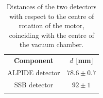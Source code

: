 \documentclass[../../main/main.tex]{subfiles}
\begin{document}
\begin{table}[!h]
    \centering
    \begin{tabular}{cc}
        \toprule
        \textbf{Component}  &   \textbf{\boldmath\( d \) [mm]}   \\
        \colrule
        ALPIDE detector & \( 78.6 \pm 0.7 \)    \\
        SSB detector    & \( 92   \pm 1   \)    \\
        \botrule
    \end{tabular}
    \caption{Distances of the two detectors with respect to the centre of rotation of the motor, coinciding with the centre of the vacuum chamber.}
    \label{tab:mechanics_support_distances}
\end{table}


\begin{figure}[h]
    \begin{minipage}[c]{0.33\linewidth}
        \vspace{0pt}
        \centering
    \end{minipage}%
    \hfill%
    \begin{minipage}[c]{0.33\linewidth}
        \vspace{0pt}
        \centering
\end{minipage}
\end{figure}
\end{document}
